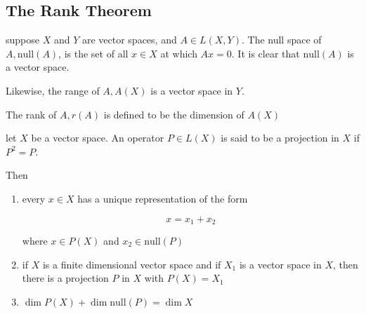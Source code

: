 \subsection{The Rank Theorem}

\begin{definition}
    suppose $X$ and $Y$ are vector spaces, and $A \in L(X,Y)$.
    The null space of $A, \mathrm{null}(A)$, is the set of all $x \in X$ at which $Ax = 0$.
    It is clear that $\mathrm{null}(A)$ is a vector space. 

    Likewise, the range of $A, A(X)$ is a vector space in $Y$.

    The rank of $A, r(A)$ is defined to be the dimension of $A(X)$ 
\end{definition}

\begin{thm}
    let $X$ be a vector space. An operator $P \in L(X)$ is said to be a projection in $X$
    if $P^2 = P$.

    Then

    \begin{enumerate}
        \item every $x \in X$ has a unique representation of the form

        \[
            x = x_1 + x_2
        \]

        where $x \in P(X)$ and $x_2 \in \mathrm{null}(P)$

        \item if $X$ is a finite dimensional vector space and if $X_1$ is a vector space in
        $X$, then there is a projection $P$ in $X$ with $P(X) = X_1$

        \item $\dim P(X) + \dim \mathrm{null}(P) = \dim X$
    \end{enumerate}
\end{thm}

